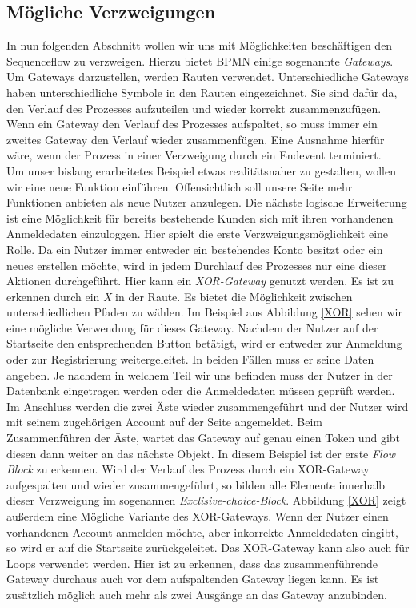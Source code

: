 \subsection{Mögliche Verzweigungen}\label{Mögliche Verzweigungen}
In nun folgenden Abschnitt wollen wir uns mit Möglichkeiten beschäftigen den Sequenceflow zu verzweigen. Hierzu bietet BPMN einige sogenannte \textit{Gateways}. Um Gateways darzustellen, werden Rauten verwendet. Unterschiedliche Gateways haben unterschiedliche Symbole in den Rauten eingezeichnet. Sie sind dafür da, den Verlauf des Prozesses aufzuteilen und wieder korrekt zusammenzufügen. Wenn ein Gateway den Verlauf des Prozesses aufspaltet, so muss immer ein zweites Gateway den Verlauf wieder zusammenfügen. Eine Ausnahme hierfür wäre, wenn der Prozess in einer Verzweigung durch ein Endevent terminiert.\\
Um unser bislang erarbeitetes Beispiel etwas realitätsnaher zu gestalten, wollen wir eine neue Funktion einführen. Offensichtlich soll unsere Seite mehr Funktionen anbieten als neue Nutzer anzulegen. Die nächste logische Erweiterung ist eine Möglichkeit für bereits bestehende Kunden sich mit ihren vorhandenen Anmeldedaten einzuloggen. Hier spielt die erste Verzweigungsmöglichkeit eine Rolle. Da ein Nutzer immer entweder ein bestehendes Konto besitzt oder ein neues erstellen möchte, wird in jedem Durchlauf des Prozesses nur eine dieser Aktionen durchgeführt. Hier kann ein \textit{XOR-Gateway} genutzt werden. Es ist zu erkennen durch ein \textit{X} in der Raute. Es bietet die Möglichkeit zwischen unterschiedlichen Pfaden zu wählen. Im Beispiel aus Abbildung \ref{XOR} sehen wir eine mögliche Verwendung für dieses Gateway. Nachdem der Nutzer auf der Startseite den entsprechenden Button betätigt, wird er entweder zur Anmeldung oder zur Registrierung weitergeleitet. In beiden Fällen muss er seine Daten angeben. Je nachdem in welchem Teil wir uns befinden muss der Nutzer in der Datenbank eingetragen werden oder die Anmeldedaten müssen geprüft werden. Im Anschluss werden die zwei Äste wieder zusammengeführt und der Nutzer wird mit seinem zugehörigen Account auf der Seite angemeldet. Beim Zusammenführen der Äste, wartet das Gateway auf genau einen Token und gibt diesen dann weiter an das nächste Objekt. In diesem Beispiel ist der erste \textit{Flow Block} zu erkennen. Wird der Verlauf des Prozess durch ein XOR-Gateway aufgespalten und wieder zusammengeführt, so bilden alle Elemente innerhalb dieser Verzweigung im sogenannen \textit{Exclisive-choice-Block}. Abbildung \ref{XOR} zeigt außerdem eine Mögliche Variante des XOR-Gateways. Wenn der Nutzer einen vorhandenen Account anmelden möchte, aber inkorrekte Anmeldedaten eingibt, so wird er auf die Startseite zurückgeleitet. Das XOR-Gateway kann also auch für Loops verwendet werden. Hier ist zu erkennen, dass das zusammenführende Gateway durchaus auch vor dem aufspaltenden Gateway liegen kann. Es ist zusätzlich möglich auch mehr als zwei Ausgänge an das Gateway anzubinden.\\
